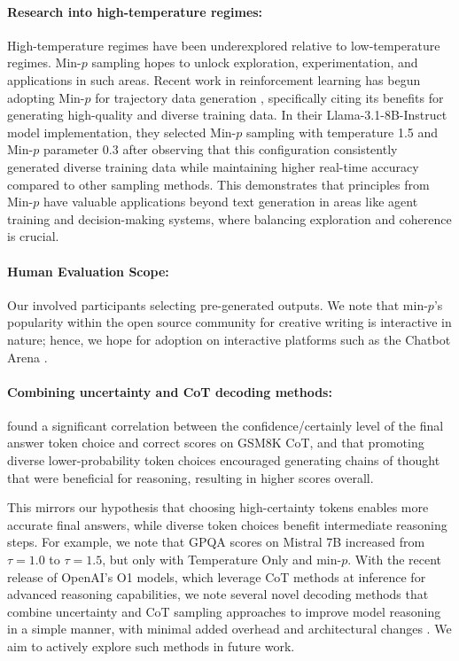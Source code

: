 \documentclass{article}
\begin{document}
\paragraph{Research into high-temperature regimes:} High-temperature regimes have been underexplored relative to low-temperature regimes. Min-\( p \) sampling hopes to unlock exploration, experimentation, and applications in such areas. Recent work in reinforcement learning has begun adopting Min-\(p\) for trajectory data generation \citep{tajwar2025traininggenerallycuriousagent}, specifically citing its benefits for generating high-quality and diverse training data. In their Llama-3.1-8B-Instruct model implementation, they selected Min-\(p\) sampling with temperature 1.5 and Min-\(p\) parameter 0.3 after observing that this configuration consistently generated diverse training data while maintaining higher real-time accuracy compared to other sampling methods. This demonstrates that principles from Min-\(p\) have valuable applications beyond text generation in areas like agent training and decision-making systems, where balancing exploration and coherence is crucial.

\paragraph{Human Evaluation Scope:} Our  involved participants selecting pre-generated outputs. We note that min-\( p \)'s popularity within the open source community for creative writing is interactive in nature; hence, we hope for adoption on interactive platforms such as the Chatbot Arena \citep{chiang2024chatbotarenaopenplatform}.

\paragraph{Combining uncertainty and CoT decoding methods:} \cite{wang2024chainofthoughtreasoningprompting} found a significant correlation between the confidence/certainly level of the final answer token choice and correct scores on GSM8K CoT, and that promoting diverse lower-probability token choices encouraged generating chains of thought that were beneficial for reasoning, resulting in higher scores overall.

This mirrors our hypothesis that choosing high-certainty tokens enables more accurate final answers, while diverse token choices benefit intermediate reasoning steps. For example, we note that GPQA scores on Mistral 7B increased from \(\tau=1.0\) to \(\tau=1.5\), but only with Temperature Only and min-\( p \). With the recent release of OpenAI's O1 models, which leverage CoT methods at inference for advanced reasoning capabilities, we note several novel decoding methods that combine uncertainty and CoT sampling approaches to improve model reasoning in a simple manner, with minimal added overhead and architectural changes \citep{wang2024chainofthoughtreasoningprompting, xjdr2024entropix} 
. We aim to actively explore such methods in future work.
\end{document}
